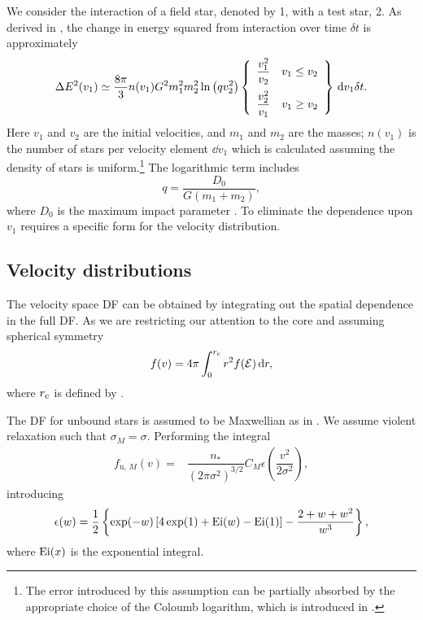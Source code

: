 We consider the interaction of a field star, denoted by 1, with a test star, 2. As derived in , the change in energy squared from interaction over time $\delta t$ is approximately \citep[chapter 2]{Chandrasekhar1960}
\begin{equation}
\Delta E^2(v_1) \simeq \dfrac{8\pi}{3} n(v_1)G^2m_1^2 m_2^2\ln\left(qv_2^2\right)\left\{\begin{array}{lr}\dfrac{v_1^2}{v_2}\vspace{2mm} & v_1 \leq v_2\\ \dfrac{v_2^2}{v_1} & v_1 \geq v_2 \end{array}\right\}\,\dd v_1\delta t.
\end{equation}
Here $v_1$ and $v_2$ are the initial velocities, and $m_1$ and $m_2$ are the masses; $n(v_1)$ is the number of stars per velocity element $\dd v_1$ which is calculated assuming the density of stars is uniform.\footnote{The error introduced by this assumption can be partially absorbed by the appropriate choice of the Coloumb logarithm, which is introduced in  \citep{Just2011}.} The logarithmic term includes
\begin{equation}
q = \dfrac{D_0}{G\left(m_1+m_2\right)},
\end{equation}
where $D_0$ is the maximum impact parameter \citep{Weinberg1986}. To eliminate the dependence upon $v_1$ requires a specific form for the velocity distribution.

\subsection{Velocity distributions}

The velocity space DF can be obtained by integrating out the spatial dependence in the full DF. As we are restricting our attention to the core and assuming spherical symmetry
\begin{equation}
f(v) = 4\pi\int_{0}^{r_\mathrm{c}}{r^2f(\mathcal{E})}\,\mathrm{d}{r},
\end{equation}
where $r_\mathrm{c}$ is defined by .

The DF for unbound stars is assumed to be Maxwellian as in . We assume violent relaxation such that $\sigma_M = \sigma$. Performing the integral
\begin{align}
f_{\mathrm{u},\,M}(v) = {} & \dfrac{n_\ast}{\left(2\pi\sigma^2\right)^{3/2}}C_M\epsilon\left(\dfrac{v^2}{2\sigma^2}\right),
\end{align}
introducing
\begin{equation}
\epsilon(w) = \dfrac{1}{2}\left\{\exp(-w)\left[4\exp(1) + \operatorname{Ei}(w) - \operatorname{Ei}(1)\right] - \dfrac{2 + w + w^2}{w^3}\right\},
\end{equation}
where $\operatorname{Ei}(x)$ is the exponential integral.

